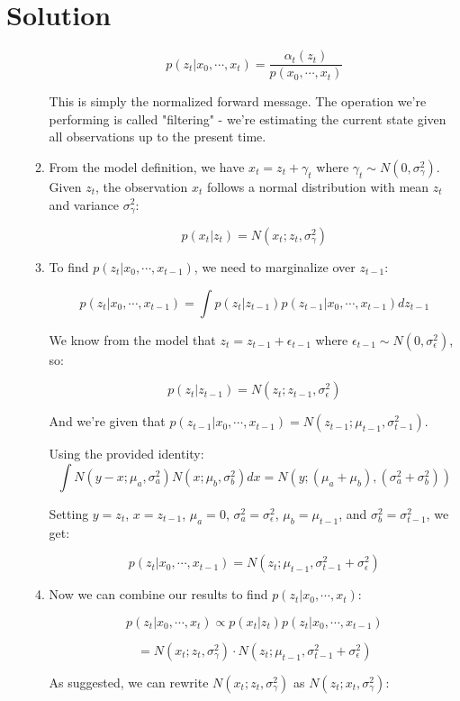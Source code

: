 \documentclass[submit]{../harvardml}
\newcommand{\sigeps}{\sigma_{\epsilon}}
\newcommand{\siggam}{\sigma_{\gamma}}
\newenvironment{solution}
  {\color{blue}\section*{Solution}}
{}
\begin{document}
\begin{solution}
\begin{enumerate}
\begin{enumerate}
        $$p(z_t| x_0, \cdots, x_{t}) = \frac{\alpha_t(z_t)}{p(x_0, \cdots, x_t)}$$
        
        This is simply the normalized forward message. The operation we're performing is called "filtering" - we're estimating the current state given all observations up to the present time.
        
        \item From the model definition, we have $x_t = z_t + \gamma_t$ where $\gamma_t \sim N(0, \siggam^2)$. Given $z_t$, the observation $x_t$ follows a normal distribution with mean $z_t$ and variance $\siggam^2$:
        
        $$p(x_t|z_t) = N(x_t; z_t, \siggam^2)$$
        
        \item To find $p(z_t|x_0, \cdots, x_{t-1})$, we need to marginalize over $z_{t-1}$:
        
        $$p(z_t|x_0, \cdots, x_{t-1}) = \int p(z_t|z_{t-1})p(z_{t-1}|x_0, \cdots, x_{t-1}) dz_{t-1}$$
        
        We know from the model that $z_t = z_{t-1} + \epsilon_{t-1}$ where $\epsilon_{t-1} \sim N(0, \sigeps^2)$, so:
        
        $$p(z_t|z_{t-1}) = N(z_t; z_{t-1}, \sigeps^2)$$
        
        And we're given that $p(z_{t-1}|x_0, \cdots, x_{t-1}) = N(z_{t-1}; \mu_{t-1}, \sigma^2_{t-1})$.
        
        Using the provided identity:
        $$\int N(y-x; \mu_a, \sigma^2_a)N(x; \mu_b, \sigma^2_b)dx = N(y; (\mu_a + \mu_b), (\sigma^2_a + \sigma^2_b))$$
        
        Setting $y = z_t$, $x = z_{t-1}$, $\mu_a = 0$, $\sigma^2_a = \sigeps^2$, $\mu_b = \mu_{t-1}$, and $\sigma^2_b = \sigma^2_{t-1}$, we get:
        
        $$p(z_t|x_0, \cdots, x_{t-1}) = N(z_t; \mu_{t-1}, \sigma^2_{t-1} + \sigeps^2)$$
        
        \item Now we can combine our results to find $p(z_t|x_0, \cdots, x_t)$:
        
        $$p(z_t|x_0, \cdots, x_t) \propto p(x_t|z_t)p(z_t|x_0, \cdots, x_{t-1})$$
        
        $$= N(x_t; z_t, \siggam^2) \cdot N(z_t; \mu_{t-1}, \sigma^2_{t-1} + \sigeps^2)$$
        
        As suggested, we can rewrite $N(x_t; z_t, \siggam^2)$ as $N(z_t; x_t, \siggam^2)$:
        

\end{enumerate}
\end{enumerate}
\end{solution}
\end{document}
